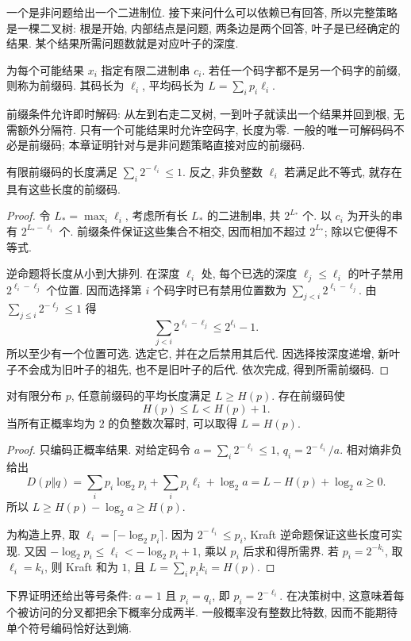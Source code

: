 一个是非问题给出一个二进制位. 接下来问什么可以依赖已有回答, 所以完整策略是一棵二叉树: 根是开始, 内部结点是问题, 两条边是两个回答, 叶子是已经确定的结果. 某个结果所需问题数就是对应叶子的深度.

\begin{definition}[前缀码]
为每个可能结果 $x_i$ 指定有限二进制串 $c_i$. 若任一个码字都不是另一个码字的前缀, 则称为前缀码. 其码长为 $\ell_i$, 平均码长为 $L=\sum_ip_i\ell_i$.
\end{definition}
前缀条件允许即时解码: 从左到右走二叉树, 一到叶子就读出一个结果并回到根, 无需额外分隔符. 只有一个可能结果时允许空码字, 长度为零. 一般的唯一可解码码不必是前缀码; 本章证明针对与是非问题策略直接对应的前缀码.

\begin{lemma}
有限前缀码的长度满足 $\sum_i2^{-\ell_i}\leq1$. 反之, 非负整数 $\ell_i$ 若满足此不等式, 就存在具有这些长度的前缀码.
\end{lemma}
\begin{proof}
令 $L_*=\max_i\ell_i$, 考虑所有长 $L_*$ 的二进制串, 共 $2^{L_*}$ 个. 以 $c_i$ 为开头的串有 $2^{L_*-\ell_i}$ 个. 前缀条件保证这些集合不相交, 因而相加不超过 $2^{L_*}$; 除以它便得不等式.

逆命题将长度从小到大排列. 在深度 $\ell_i$ 处, 每个已选的深度 $\ell_j\leq\ell_i$ 的叶子禁用 $2^{\ell_i-\ell_j}$ 个位置. 因而选择第 $i$ 个码字时已有禁用位置数为
$\sum_{j<i}2^{\ell_i-\ell_j}$. 由 $\sum_{j\leq i}2^{-\ell_j}\leq1$ 得
\[
 \sum_{j<i}2^{\ell_i-\ell_j}\leq2^{\ell_i}-1.
\]
所以至少有一个位置可选. 选定它, 并在之后禁用其后代. 因选择按深度递增, 新叶子不会成为旧叶子的祖先, 也不是旧叶子的后代. 依次完成, 得到所需前缀码.
\end{proof}

\begin{theorem}[无噪声编码界]
对有限分布 $p$, 任意前缀码的平均长度满足 $L\geq H(p)$. 存在前缀码使
\[
 H(p)\leq L<H(p)+1.
\]
当所有正概率均为 $2$ 的负整数次幂时, 可以取得 $L=H(p)$.
\end{theorem}
\begin{proof}
只编码正概率结果. 对给定码令 $a=\sum_i2^{-\ell_i}\leq1$, $q_i=2^{-\ell_i}/a$. 相对熵非负给出
\[
 D(p\Vert q)=\sum_ip_i\log_2p_i+\sum_ip_i\ell_i+\log_2a
 =L-H(p)+\log_2a\geq0.
\]
所以 $L\geq H(p)-\log_2a\geq H(p)$.

为构造上界, 取 $\ell_i=\lceil-\log_2p_i\rceil$. 因为
$2^{-\ell_i}\leq p_i$, Kraft 逆命题保证这些长度可实现. 又因
$-\log_2p_i\leq\ell_i<-\log_2p_i+1$, 乘以 $p_i$ 后求和得所需界.
若 $p_i=2^{-k_i}$, 取 $\ell_i=k_i$, 则 Kraft 和为 $1$, 且 $L=\sum_ip_ik_i=H(p)$.
\end{proof}
下界证明还给出等号条件: $a=1$ 且 $p_i=q_i$, 即 $p_i=2^{-\ell_i}$. 在决策树中, 这意味着每个被访问的分叉都把余下概率分成两半. 一般概率没有整数比特数, 因而不能期待单个符号编码恰好达到熵.

